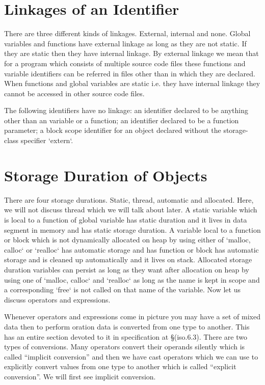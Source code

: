 \section{Linkages of an Identifier}
There are three different kinds of linkages. External, internal and
none. Global variables and functions have external linkage as long as they are
not static. If they are static then they have internal linkage. By external
linkage we mean that for a program which consists of multiple source code files
these functions and variable identifiers can be referred in files other than in
which they are declared. When functions and global variables are static
i.e. they have internal linkage they cannot be accessed in other source code
files.

The following identifiers have no linkage: an identifier declared to be
anything other than an variable or a function; an identifier declared to be a
function parameter; a block scope identifier for an object declared without the
storage-class specifier `extern`.

\section{Storage Duration of Objects}
There are four storage durations. Static, thread, automatic and
allocated. Here, we will not discuss thread which we will talk about later. A
static variable which is local to a function of global variable has static
duration and it lives in data segment in memory and has static storage
duration. A variable local to a function or block which is not dynamically
allocated on heap by using either of `malloc, calloc` or `realloc` has
automatic storage and has function or block has automatic storage and is
cleaned up automatically and it lives on stack. Allocated storage duration
variables can persist as long as they want after allocation on heap by using
one of `malloc, calloc` and `realloc` as long as the name is kept
in scope and a corresponding `free` is not called on that name of the
variable. Now let us discuss operators and expressions.


Whenever operators and expressions come in picture you may have a set of mixed
data then to perform oration data is converted from one type to another. This
has an entire section devoted to it in specification at \S(iso.6.3). There are two
types of conversions. Many operators convert their operands silently which is
called ``implicit conversion'' and then we have cast operators
which we can use to explicitly convert values from one type to another which is
called ``explicit conversion''. We will first see implicit conversion.

